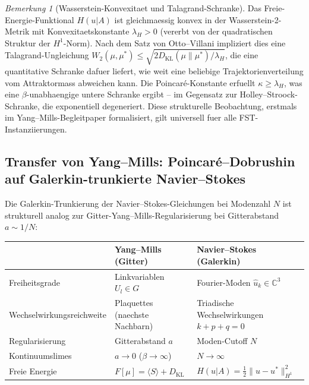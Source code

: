 \documentclass[12pt,a4paper]{article}
\theoremstyle{definition}
\theoremstyle{plain}
\theoremstyle{remark}
\newtheorem{remark}[definition]{Bemerkung}
\begin{document}
\begin{remark}[Wasserstein-Konvexitaet und Talagrand-Schranke]
\label{rem:talagrand}
Das Freie-Energie-Funktional $H(u|A)$ ist gleichmaessig konvex in der Wasserstein-2-Metrik mit Konvexitaetskonstante $\lambda_H > 0$ (vererbt von der quadratischen Struktur der $H^1$-Norm). Nach dem Satz von Otto--Villani impliziert dies eine Talagrand-Ungleichung $W_2(\mu, \mu^*) \leq \sqrt{2 D_{\mathrm{KL}}(\mu \| \mu^*) / \lambda_H}$, die eine quantitative Schranke dafuer liefert, wie weit eine beliebige Trajektorienverteilung vom Attraktormass abweichen kann. Die Poincar\'e-Konstante erfuellt $\kappa \geq \lambda_H$, was eine $\beta$-unabhaengige untere Schranke ergibt -- im Gegensatz zur Holley--Stroock-Schranke, die exponentiell degeneriert. Diese strukturelle Beobachtung, erstmals im Yang--Mills-Begleitpaper formalisiert, gilt universell fuer alle FST-Instanziierungen.
\end{remark}

\subsection{Transfer von Yang--Mills: Poincar\'e--Dobrushin auf Galerkin-trunkierte Navier--Stokes}
\label{sec:ym-ns-transfer}

Die Galerkin-Trunkierung der Navier--Stokes-Gleichungen bei Modenzahl $N$ ist strukturell analog zur Gitter-Yang--Mills-Regularisierung bei Gitterabstand $a \sim 1/N$:

\begin{center}
\begin{tabular}{l|l|l}
& \textbf{Yang--Mills (Gitter)} & \textbf{Navier--Stokes (Galerkin)} \\
\hline
Freiheitsgrade & Linkvariablen $U_l \in G$ & Fourier-Moden $\hat{u}_k \in \mathbb{C}^3$ \\
Wechselwirkungsreichweite & Plaquettes (naechste Nachbarn) & Triadische Wechselwirkungen $k + p + q = 0$ \\
Regularisierung & Gitterabstand $a$ & Moden-Cutoff $N$ \\
Kontinuumslimes & $a \to 0$ ($\beta \to \infty$) & $N \to \infty$ \\
Freie Energie & $F[\mu] = \langle S \rangle + D_{\mathrm{KL}}$ & $H(u|A) = \frac{1}{2}\|u - u^*\|_{H^1}^2$ \\
\end{tabular}
\end{center}
\end{document}
